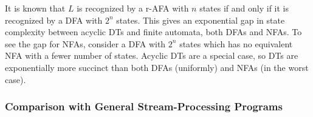 It is known \cite{chandra1981alternation,fellah1990constructions} that $L$ is recognized by a r-AFA with $n$ states if and only if it is recognized by a DFA with $2^n$ states. This gives an exponential gap in state complexity between acyclic DTs and finite automata, both DFAs and NFAs. To see the gap for NFAs, consider a DFA with $2^n$ states which has no equivalent NFA with a fewer number of states. Acyclic DTs are a special case, so DTs are exponentially more succinct than both DFAs (uniformly) and NFAs (in the worst case).

\subsubsection{Comparison with General Stream-Processing Programs}
\label{subsec:dts-and-spp}


\newcommand{\Stream}{\textsc{Stream}}

